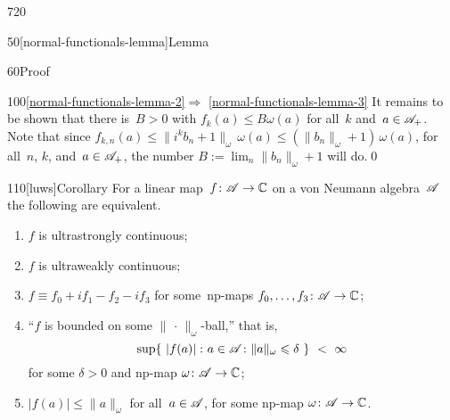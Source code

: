 \begin{parsec}{720}
\begin{point}{50}[normal-functionals-lemma]{Lemma}
\begin{point}{60}{Proof}
\begin{point}{100}{\ref{normal-functionals-lemma-2}$\Longrightarrow$%
\ref{normal-functionals-lemma-3}}
It remains to be shown that there is~$B>0$ with $f_k(a)\leq B\omega(a)$
for all~$k$ and~$a\in\mathscr{A}_{+}$.
Note that since $f_{k,n}(a) \leq \|i^kb_n+1\|_\omega \,\omega(a)
\leq (\|b_n\|_\omega+1) \,\omega(a)$,
for all~$n$, $k$, and~$a\in\mathscr{A}_{+}$,
the number $B:=\lim_n \|b_n\|_\omega +1 $ will do.\qed
\end{point}
\end{point}
\end{point}
\begin{point}{110}[luws]{Corollary}%
For a linear map~$f\colon \mathscr{A}\to \mathbb{C}$
on a von Neumann algebra~$\mathscr{A}$ the following are equivalent.
\begin{enumerate}
\item
$f$ is ultrastrongly continuous;
\item
$f$ is ultraweakly continuous;
\item
$f\equiv f_0+if_1-f_2-if_3$
for some~np-maps $f_0,\dotsc,f_3\colon \mathscr{A}\to\mathbb{C}$;
\item
``$f$ is bounded on some $\|\,\cdot\,\|_\omega$-ball,''
that is,
\begin{equation*}
	\sup\{\ \left|f(a)\right|\colon a\in \mathscr{A}\colon 
		\|a\|_\omega\leqslant \delta\ \}\ <\ \infty
\end{equation*}
for some $\delta>0$ and  np-map $\omega\colon \mathscr{A}\to\mathbb{C}$;
\item
$\left|f(a)\right|\leq \|a\|_\omega$
for all~$a\in \mathscr{A}$, for some np-map $\omega\colon \mathscr{A}\to\mathbb{C}$.
\end{enumerate}
\end{point}
\end{parsec}
%
%
